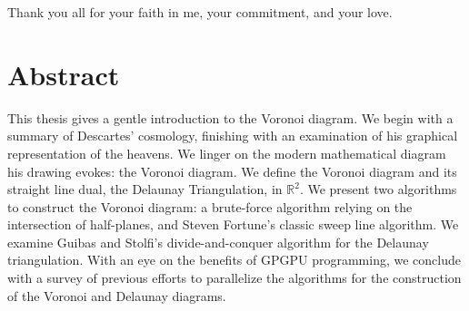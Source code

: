 \documentclass[12pt,twoside]{reedthesis}
\begin{document}
    Thank you all for your faith in me, your commitment, and your love. 







    \tableofcontents
    \listofalgorithms
    \listoffigures

    \chapter*{Abstract}
      This thesis gives a gentle introduction to the Voronoi diagram. We begin with a summary of Descartes' cosmology, finishing with an examination of his graphical representation of the heavens. We linger on the modern mathematical diagram his drawing evokes: the Voronoi diagram. We define the Voronoi diagram and its straight line dual, the Delaunay Triangulation, in $\mathds{R}^2$. We present two algorithms to construct the Voronoi diagram: a brute-force algorithm relying on the intersection of half-planes, and Steven Fortune's classic sweep line algorithm. We examine Guibas and Stolfi's divide-and-conquer algorithm for the Delaunay triangulation. With an eye on the benefits of GPGPU programming, we conclude with a survey of previous efforts to parallelize the algorithms for the construction of the Voronoi and Delaunay diagrams. 
	
\end{document}
